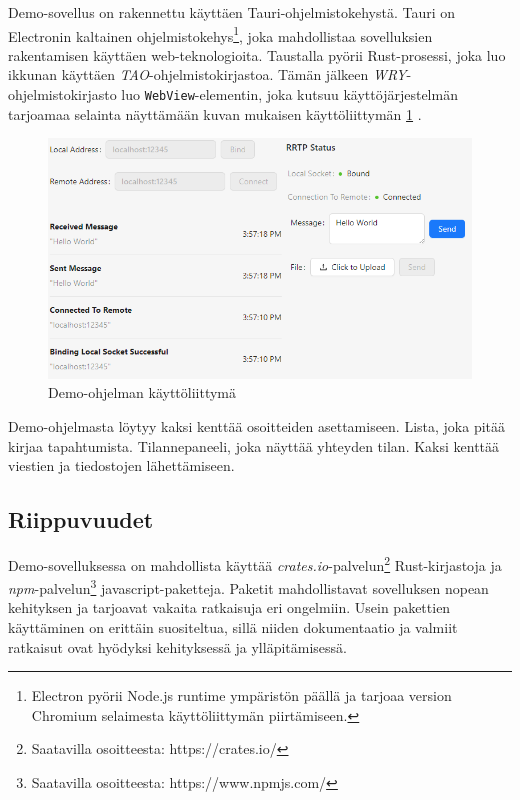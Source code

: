 \documentclass[a4paper,12pt]{article}
\begin{document}
    Demo-sovellus on rakennettu käyttäen Tauri-ohjelmistokehystä.
    Tauri on Electronin kaltainen ohjelmistokehys\footnote{Electron pyörii Node.js runtime ympäristön päällä ja tarjoaa version Chromium selaimesta käyttöliittymän piirtämiseen.}, joka mahdollistaa sovelluksien rakentamisen käyttäen web-teknologioita. Taustalla pyörii Rust-prosessi, joka luo ikkunan käyttäen \textit{TAO}-ohjelmistokirjastoa. Tämän jälkeen \textit{WRY}-ohjelmistokirjasto luo \lstinline{WebView}-elementin, joka kutsuu käyttöjärjestelmän tarjoamaa selainta näyttämään kuvan mukaisen käyttöliittymän \ref{fig:demo_interface} \cite{tauri-app}.

    \begin{figure}[h!]
        \centering
        
        \includegraphics[width=\textwidth]{doc/latex/src/images/RRTP.png}
        \caption{Demo-ohjelman käyttöliittymä}
        \label{fig:demo_interface}
    \end{figure}
    
    Demo-ohjelmasta löytyy kaksi kenttää osoitteiden asettamiseen. Lista, joka
    pitää kirjaa tapahtumista. Tilannepaneeli, joka näyttää yhteyden tilan.
    Kaksi kenttää viestien ja tiedostojen lähettämiseen. \par

    \subsection{Riippuvuudet}
    Demo-sovelluksessa on mahdollista käyttää \textit{crates.io}-palvelun\footnote{Saatavilla osoitteesta: https://crates.io/} Rust-kirjastoja ja \textit{npm}-palvelun\footnote{Saatavilla osoitteesta: https://www.npmjs.com/} javascript-paketteja. Paketit mahdollistavat sovelluksen nopean kehityksen ja tarjoavat vakaita ratkaisuja eri ongelmiin. Usein pakettien käyttäminen on erittäin suositeltua, sillä niiden dokumentaatio ja valmiit ratkaisut ovat hyödyksi kehityksessä ja ylläpitämisessä.
\end{document}
